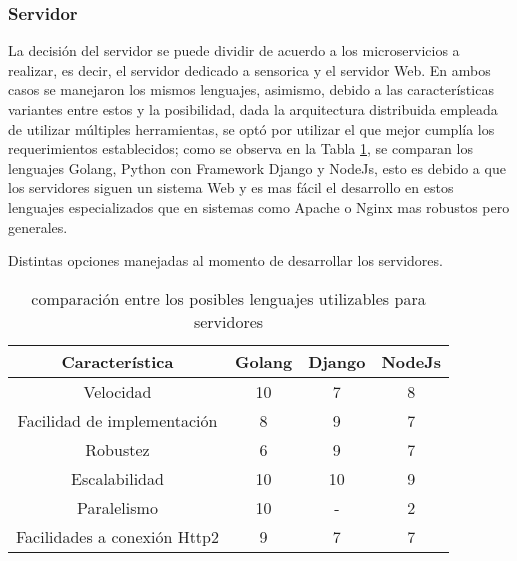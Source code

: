     \subsubsection{Servidor}
    La decisión del servidor se puede  dividir de acuerdo a los
    microservicios a realizar, es decir, el servidor dedicado a sensorica y
    el servidor Web. En ambos casos se manejaron los mismos lenguajes, asimismo, debido a
    las características variantes entre estos y la posibilidad, dada la arquitectura
    distribuida empleada de utilizar múltiples herramientas, se optó por utilizar
    el que mejor cumplía los requerimientos establecidos; como se observa en la
    Tabla \ref{tab:LenguajesServidor}, se comparan los lenguajes Golang, Python
    con Framework Django y NodeJs, esto es debido a que los servidores siguen un
    sistema Web y es mas fácil el desarrollo en estos lenguajes especializados que
    en sistemas como Apache o Nginx mas robustos pero generales.

    \begin{table}[ht]
        \caption[Comparativa de posibles lenguajes nivel servidor]{comparación entre
        los posibles lenguajes utilizables para servidores}
        \label{tab:LenguajesServidor}
        \begin{center}
            Distintas opciones manejadas al momento de desarrollar los servidores.\\

            \vspace{0.3cm}
            \begin{tabular}{|c|c|c|c|}
                \hline
                Característica              & Golang & Django & NodeJs\\\hline
                \hline
                Velocidad                   & 10    & 7     &   8   \\\hline
                Facilidad de implementación & 8     & 9     &  7\\\hline
                Robustez                    & 6     & 9     & 7 \\\hline
                Escalabilidad               & 10    & 10    & 9 \\\hline
                Paralelismo                 & 10    & -     & 2 \\\hline
                Facilidades a conexión Http2& 9     &7      & 7 \\
                \hline
            \end{tabular}
        \end{center}
    \end{table}

